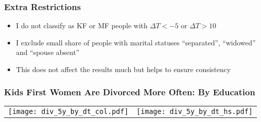 \documentclass[aspectratio=169]{beamer}
\newcommand{\backupend}{
   \addtocounter{framenumberappendix}{-\value{framenumber}}
   \addtocounter{framenumber}{\value{framenumberappendix}} 
}
\let\olditem\item
\renewcommand{\item}{%
\olditem\vspace{\fill}}
\begin{document}
\begin{frame}[plain,label=extra-restrictions]
\frametitle{Extra Restrictions}
\begin{itemize}
\item I do not classify as KF or MF people with $\Delta T < -5$ or $\Delta T > 10$
\item I exclude small share of people with marital statuses ``separated'', ``widowed'' and ``spouse absent''
\item This does not affect the results much but helps to ensure consistency
\end{itemize}
\hyperlink{kfandmf}{} 
\end{frame}


\begin{frame}[plain,label=dt_graph_educ]
\frametitle{Kids First Women Are Divorced More Often: By Education}

\begin{tabular}{c c}
\hspace{-0.5cm}\texttt{[image: div\_5y\_by\_dt\_col.pdf]} & \hspace{0.5cm}\texttt{[image: div\_5y\_by\_dt\_hs.pdf]}
\end{tabular}
\hyperlink{dt_graph}{} 
\end{frame}

\backupend
\end{document}
